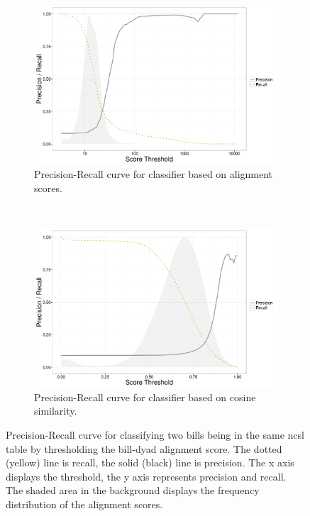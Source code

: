 \documentclass[12pt]{article} %
\begin{document}
\begin{figure}[ht!]
    \centering
    \begin{subfigure}[t]{0.5\textwidth}
        \centering
        \includegraphics[width=\textwidth]{figures/ncsl_pr_nosplit.png}
        \caption{Precision-Recall curve for classifier based on alignment scores.}
    \end{subfigure}%
    ~ 
    \begin{subfigure}[t]{0.5\textwidth}
        \centering
        \includegraphics[width=\textwidth]{figures/ncsl_pr_cosm.png}
        \caption{Precision-Recall curve for classifier based on cosine similarity.}
    \end{subfigure}
    \caption{Precision-Recall curve for classifying two bills being in the same
    ncsl table by thresholding the bill-dyad alignment score. The dotted (yellow) line is recall, the solid (black) line is precision. The x axis
displays the threshold, the y axis represents precision and recall. The shaded
area in the background displays the frequency distribution of the alignment
scores.}
\label{fig:ncsl_prec_rec}
\end{figure}
\end{document}
